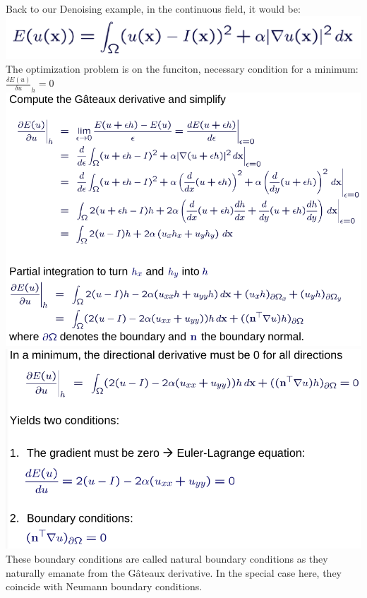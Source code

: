 \documentclass{article}
\begin{document}
Back to our Denoising example, in the continuous field, it would be:\\
\includegraphics[scale=0.3]{40.png}\\
The optimization problem is on the funciton, necessary condition for a minimum:\\
$\frac{\delta E(u)}{\delta u}_h = 0$\\
\includegraphics[scale=0.3]{41.png}\\
\includegraphics[scale=0.3]{42.png}\\
These boundary conditions are called natural boundary conditions as they naturally emanate from the Gâteaux derivative. In the special case here, they coincide with Neumann boundary conditions.\\
\end{document}

